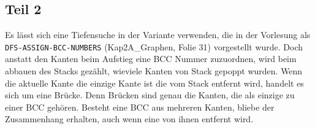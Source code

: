 \documentclass[parskip=half,a4paper]{scrartcl}
\begin{document}
\subsection*{Teil 2}

Es lässt sich eine Tiefensuche in der Variante verwenden, die in der Vorlesung als \texttt{DFS-ASSIGN-BCC-NUMBERS} (Kap2A\_Graphen, Folie 31) vorgestellt wurde. Doch anstatt den Kanten beim Aufstieg eine BCC Nummer zuzuordnen, wird beim abbauen des Stacks gezählt, wieviele Kanten von Stack gepoppt wurden. Wenn die aktuelle Kante die einzige Kante ist die vom Stack entfernt wird, handelt es sich um eine Brücke. Denn Brücken sind genau die Kanten, die als einzige zu einer BCC gehören. Besteht eine BCC aus mehreren Kanten, bliebe der Zusammenhang erhalten, auch wenn eine von ihnen entfernt wird.
\end{document}
